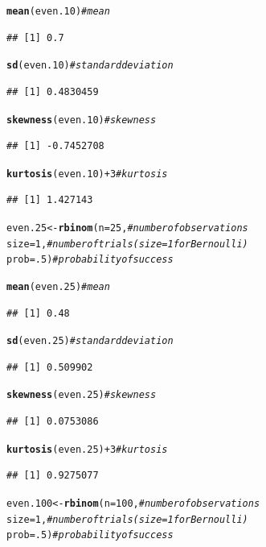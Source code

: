 \documentclass{article}\usepackage[]{graphicx}\usepackage[]{color}
\makeatletter
\newcommand{\hlnum}[1]{\textcolor[rgb]{0.686,0.059,0.569}{#1}}%
\newcommand{\hlcom}[1]{\textcolor[rgb]{0.678,0.584,0.686}{\textit{#1}}}%
\newcommand{\hlopt}[1]{\textcolor[rgb]{0,0,0}{#1}}%
\newcommand{\hlstd}[1]{\textcolor[rgb]{0.345,0.345,0.345}{#1}}%
\newcommand{\hlkwb}[1]{\textcolor[rgb]{0.69,0.353,0.396}{#1}}%
\newcommand{\hlkwc}[1]{\textcolor[rgb]{0.333,0.667,0.333}{#1}}%
\newcommand{\hlkwd}[1]{\textcolor[rgb]{0.737,0.353,0.396}{\textbf{#1}}}%
\newenvironment{kframe}{%
 \def\at@end@of@kframe{}%
 \ifinner\ifhmode%
  \def\at@end@of@kframe{\end{minipage}}%
  \begin{minipage}{\columnwidth}%
 \fi\fi%
 \def\FrameCommand##1{\hskip\@totalleftmargin \hskip-\fboxsep
 \colorbox{shadecolor}{##1}\hskip-\fboxsep
     \hskip-\linewidth \hskip-\@totalleftmargin \hskip\columnwidth}%
 \MakeFramed {\advance\hsize-\width
   \@totalleftmargin\z@ \linewidth\hsize
   \@setminipage}}%
 {\par\unskip\endMakeFramed%
 \at@end@of@kframe}
\newenvironment{knitrout}{}{} %
\makeatother
\begin{document}
\begin{enumerate}
\begin{enumerate}
\begin{knitrout}
\begin{kframe}
\begin{alltt}
\hlkwd{mean}\hlstd{(even.10)}                    \hlcom{#mean}
\end{alltt}
\begin{verbatim}
## [1] 0.7
\end{verbatim}
\begin{alltt}
\hlkwd{sd}\hlstd{(even.10)}                      \hlcom{#standard deviation}
\end{alltt}
\begin{verbatim}
## [1] 0.4830459
\end{verbatim}
\begin{alltt}
\hlkwd{skewness}\hlstd{(even.10)}                \hlcom{#skewness}
\end{alltt}
\begin{verbatim}
## [1] -0.7452708
\end{verbatim}
\begin{alltt}
\hlkwd{kurtosis}\hlstd{(even.10)}\hlopt{+}\hlnum{3}              \hlcom{#kurtosis}
\end{alltt}
\begin{verbatim}
## [1] 1.427143
\end{verbatim}
\begin{alltt}
\hlstd{even.25}  \hlkwb{<-} \hlkwd{rbinom}\hlstd{(}\hlkwc{n}\hlstd{=}\hlnum{25}\hlstd{,}         \hlcom{#number of observations}
              \hlkwc{size}\hlstd{=}\hlnum{1}\hlstd{,}            \hlcom{#number of trials (size=1 for Bernoulli)}
              \hlkwc{prob}\hlstd{=}\hlnum{.5}\hlstd{)}           \hlcom{#probability of success}

\hlkwd{mean}\hlstd{(even.25)}                    \hlcom{#mean}
\end{alltt}
\begin{verbatim}
## [1] 0.48
\end{verbatim}
\begin{alltt}
\hlkwd{sd}\hlstd{(even.25)}                      \hlcom{#standard deviation}
\end{alltt}
\begin{verbatim}
## [1] 0.509902
\end{verbatim}
\begin{alltt}
\hlkwd{skewness}\hlstd{(even.25)}                \hlcom{#skewness}
\end{alltt}
\begin{verbatim}
## [1] 0.0753086
\end{verbatim}
\begin{alltt}
\hlkwd{kurtosis}\hlstd{(even.25)}\hlopt{+}\hlnum{3}              \hlcom{#kurtosis}
\end{alltt}
\begin{verbatim}
## [1] 0.9275077
\end{verbatim}
\begin{alltt}
\hlstd{even.100} \hlkwb{<-} \hlkwd{rbinom}\hlstd{(}\hlkwc{n}\hlstd{=}\hlnum{100}\hlstd{,}        \hlcom{#number of observations}
              \hlkwc{size}\hlstd{=}\hlnum{1}\hlstd{,}            \hlcom{#number of trials (size=1 for Bernoulli)}
              \hlkwc{prob}\hlstd{=}\hlnum{.5}\hlstd{)}           \hlcom{#probability of success}


\end{alltt}
\end{kframe}
\end{knitrout}
\end{enumerate}
\end{enumerate}
\end{document}
